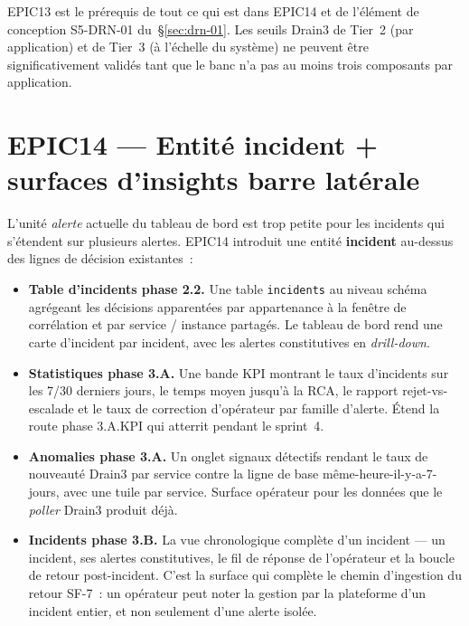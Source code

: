 \documentclass[11pt,a4paper,oneside]{report}
\begin{document}
EPIC13 est le prérequis de tout ce qui est dans EPIC14 et de
l'élément de conception S5-DRN-01 du~\S\ref{sec:drn-01}. Les
seuils Drain3 de Tier~2 (par application) et de Tier~3 (à l'échelle
du système) ne peuvent être significativement validés tant que le
banc n'a pas au moins trois composants par application.

\section{EPIC14 --- Entité incident + surfaces d'insights barre latérale}

L'unité \emph{alerte} actuelle du tableau de bord est trop petite
pour les incidents qui s'étendent sur plusieurs alertes. EPIC14
introduit une entité \textbf{incident} au-dessus des lignes de
décision existantes~:

\begin{itemize}
  \item \textbf{Table d'incidents phase 2.2.} Une table
        \texttt{incidents} au niveau schéma agrégeant les
        décisions apparentées par appartenance à la fenêtre de
        corrélation et par service / instance partagés. Le tableau
        de bord rend une carte d'incident par incident, avec les
        alertes constitutives en \emph{drill-down}.
  \item \textbf{Statistiques phase 3.A.} Une bande KPI montrant le
        taux d'incidents sur les 7/30 derniers jours, le temps
        moyen jusqu'à la RCA, le rapport rejet-vs-escalade et le
        taux de correction d'opérateur par famille d'alerte.
        Étend la route phase 3.A.KPI qui atterrit pendant le
        sprint~4.
  \item \textbf{Anomalies phase 3.A.} Un onglet signaux
        détectifs rendant le taux de nouveauté Drain3 par service
        contre la ligne de base même-heure-il-y-a-7-jours, avec
        une tuile par service. Surface opérateur pour les données
        que le \emph{poller} Drain3 produit déjà.
  \item \textbf{Incidents phase 3.B.} La vue chronologique complète
        d'un incident --- un incident, ses alertes constitutives,
        le fil de réponse de l'opérateur et la boucle de retour
        post-incident. C'est la surface qui complète le chemin
        d'ingestion du retour SF-7~: un opérateur peut noter la
        gestion par la plateforme d'un incident entier, et non
        seulement d'une alerte isolée.
\end{itemize}
\end{document}
